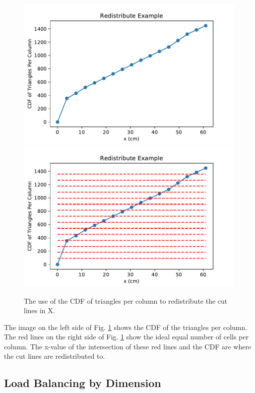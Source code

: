 \documentclass[11pt, letterpaper,titlepage,oneside]{article}
\begin{document}
\begin{figure}[H]
\centering
\includegraphics[scale=0.5]{../figures/redistribute_before.pdf}
\includegraphics[scale=0.5]{../figures/redistribute_after.pdf}
\caption{The use of the CDF of triangles per column to redistribute the cut lines in X.}
\label{redistribute}
\end{figure}

The image on the left side of Fig. \ref{redistribute} shows the CDF of the triangles per column. The red lines on the right side of Fig. \ref{redistribute} show the ideal equal number of cells per column. The x-value of the intersection of these red lines and the CDF are where the cut lines are redistributed to. 

\subsection{Load Balancing by Dimension} \label{lbd_section}
\end{document}
